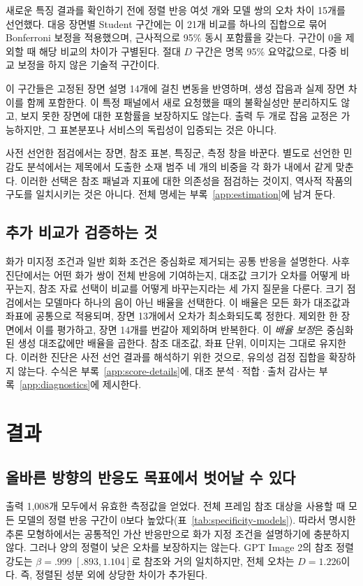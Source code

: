 \documentclass[11pt,a4paper]{article}
\begin{document}
새로운 특징 결과를 확인하기 전에 정렬 반응 여섯 개와 모델 쌍의 오차 차이 15개를 선언했다. 대응 장면별 Student 구간에는 이 21개 비교를 하나의 집합으로 묶어 Bonferroni 보정을 적용했으며, 근사적으로 95\% 동시 포함률을 갖는다. 구간이 0을 제외할 때 해당 비교의 차이가 구별된다. 절대 $D$ 구간은 명목 95\% 요약값으로, 다중 비교 보정을 하지 않은 기술적 구간이다.

이 구간들은 고정된 장면 설명 14개에 걸친 변동을 반영하며, 생성 잡음과 실제 장면 차이를 함께 포함한다. 이 특정 패널에서 새로 요청했을 때의 불확실성만 분리하지도 않고, 보지 못한 장면에 대한 포함률을 보장하지도 않는다. 출력 두 개로 잡음 교정은 가능하지만, 그 표본분포나 서비스의 독립성이 입증되는 것은 아니다.

사전 선언한 점검에서는 장면, 참조 표본, 특징군, 측정 창을 바꾼다. 별도로 선언한 민감도 분석에서는 제목에서 도출한 소재 범주 네 개의 비중을 각 화가 내에서 같게 맞춘다. 이러한 선택은 참조 패널과 지표에 대한 의존성을 점검하는 것이지, 역사적 작품의 구도를 일치시키는 것은 아니다. 전체 명세는 부록~\ref{app:estimation}에 남겨 둔다.

\subsection{추가 비교가 검증하는 것}\label{sec:diagnostics}
화가 미지정 조건과 일반 회화 조건은 중심화로 제거되는 공통 반응을 설명한다. 사후 진단에서는 어떤 화가 쌍이 전체 반응에 기여하는지, 대조값 크기가 오차를 어떻게 바꾸는지, 참조 자료 선택이 비교를 어떻게 바꾸는지라는 세 가지 질문을 다룬다. 크기 점검에서는 모델마다 하나의 음이 아닌 배율을 선택한다. 이 배율은 모든 화가 대조값과 좌표에 공통으로 적용되며, 장면 13개에서 오차가 최소화되도록 정한다. 제외한 한 장면에서 이를 평가하고, 장면 14개를 번갈아 제외하며 반복한다. 이 \emph{배율 보정}은 중심화된 생성 대조값에만 배율을 곱한다. 참조 대조값, 좌표 단위, 이미지는 그대로 유지한다. 이러한 진단은 사전 선언 결과를 해석하기 위한 것으로, 유의성 검정 집합을 확장하지 않는다. 수식은 부록~\ref{app:score-details}에, 대조 분석·적합·출처 감사는 부록~\ref{app:diagnostics}에 제시한다.

\section{결과}\label{sec:results}
\subsection{올바른 방향의 반응도 목표에서 벗어날 수 있다}
출력 1,008개 모두에서 유효한 측정값을 얻었다. 전체 프레임 참조 대상을 사용할 때 모든 모델의 정렬 반응 구간이 0보다 높았다(표~\ref{tab:specificity-models}). 따라서 명시한 추론 모형하에서는 공통적인 가산 반응만으로 화가 지정 조건을 설명하기에 충분하지 않다. 그러나 양의 정렬이 낮은 오차를 보장하지는 않는다. GPT Image 2의 참조 정렬 강도는 $\beta=.999\;[.893,1.104]$로 참조와 거의 일치하지만, 전체 오차는 $D=1.226$이다. 즉, 정렬된 성분 외에 상당한 차이가 추가된다.
\end{document}
